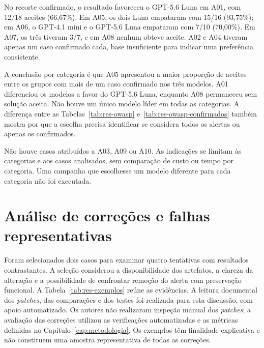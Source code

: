 No recorte confirmado, o resultado favoreceu o GPT-5.6 Luna em A01, com 12/18 aceites (66,67\%). Em A05, os dois Luna empataram com 15/16 (93,75\%); em A06, o GPT-4.1 mini e o GPT-5.6 Luna empataram com 7/10 (70,00\%). Em A07, os três tiveram 3/7, e em A08 nenhum obteve aceite. A02 e A04 tiveram apenas um caso confirmado cada, base insuficiente para indicar uma preferência consistente.

A conclusão por categoria é que A05 apresentou a maior proporção de aceites entre os grupos com mais de um caso confirmado nos três modelos. A01 diferenciou os modelos a favor do GPT-5.6 Luna, enquanto A08 permaneceu sem solução aceita. Não houve um único modelo líder em todas as categorias. A diferença entre as Tabelas~\ref{tab:res-owasp} e~\ref{tab:res-owasp-confirmados} também mostra por que a escolha precisa identificar se considera todos os alertas ou apenas os confirmados.

Não houve casos atribuídos a A03, A09 ou A10. As indicações se limitam às categorias e aos casos analisados, sem comparação de custo ou tempo por categoria. Uma campanha que escolhesse um modelo diferente para cada categoria não foi executada.

\section{Análise de correções e falhas representativas}

\label{sec:res-exemplos}

Foram selecionados dois casos para examinar quatro tentativas com resultados contrastantes. A seleção considerou a disponibilidade dos artefatos, a clareza da alteração e a possibilidade de confrontar remoção do alerta com preservação funcional. A Tabela~\ref{tab:res-exemplos} reúne as evidências. A leitura documental dos \textit{patches}, das comparações e dos testes foi realizada para esta discussão, com apoio automatizado. Os autores não realizaram inspeção manual dos \textit{patches}; a avaliação das correções utilizou as verificações automatizadas e as métricas definidas no Capítulo~\ref{cap:metodologia}. Os exemplos têm finalidade explicativa e não constituem uma amostra representativa de todas as correções.

